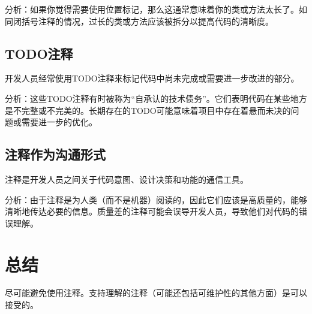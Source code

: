 分析：如果你觉得需要使用位置标记，那么这通常意味着你的类或方法太长了。如同闭括号注释的情况，过长的类或方法应该被拆分以提高代码的清晰度。
\subsection{TODO注释}
开发人员经常使用TODO注释来标记代码中尚未完成或需要进一步改进的部分。

分析：这些TODO注释有时被称为“自承认的技术债务”。它们表明代码在某些地方是不完整或不完美的。长期存在的TODO可能意味着项目中存在着悬而未决的问题或需要进一步的优化。
\subsection{注释作为沟通形式}
注释是开发人员之间关于代码意图、设计决策和功能的通信工具。

分析：由于注释是为人类（而不是机器）阅读的，因此它们应该是高质量的，能够清晰地传达必要的信息。质量差的注释可能会误导开发人员，导致他们对代码的错误理解。

\section{总结}
尽可能避免使用注释。支持理解的注释（可能还包括可维护性的其他方面）是可以接受的。